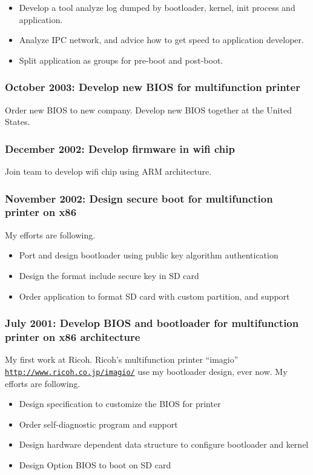 \documentclass[letterpaper]{article}
\begin{document}
\begin{itemize}
  \item Develop a tool analyze log dumped by bootloader, kernel, init process and application.
  \item Analyze IPC network, and advice how to get speed to application developer.
  \item Split application as groups for pre-boot and post-boot.
\end{itemize}

\subsubsection*{October 2003: Develop new BIOS for multifunction printer}
Order new BIOS to new company.
Develop new BIOS together at the United States.

\subsubsection*{December 2002: Develop firmware in wifi chip}
Join team to develop wifi chip using ARM architecture.

\subsubsection*{November 2002: Design secure boot for multifunction printer on x86}
My efforts are following.
\begin{itemize}
  \item Port and design bootloader using public key algorithm authentication
  \item Design the format include secure key in SD card
  \item Order application to format SD card with custom partition, and support
\end{itemize}

\subsubsection*{July 2001: Develop BIOS and bootloader for multifunction printer on x86 architecture}
My first work at Ricoh.
Ricoh's multifunction printer ``imagio'' \href{http://www.ricoh.co.jp/imagio/}{\tt http://www.ricoh.co.jp/imagio/} use my bootloader design, ever now.
My efforts are following.
\begin{itemize}
  \item Design specification to customize the BIOS for printer
  \item Order self-diagnostic program and support
  \item Design hardware dependent data structure to configure bootloader and kernel
  \item Design Option BIOS to boot on SD card
\end{itemize}
\end{document}
